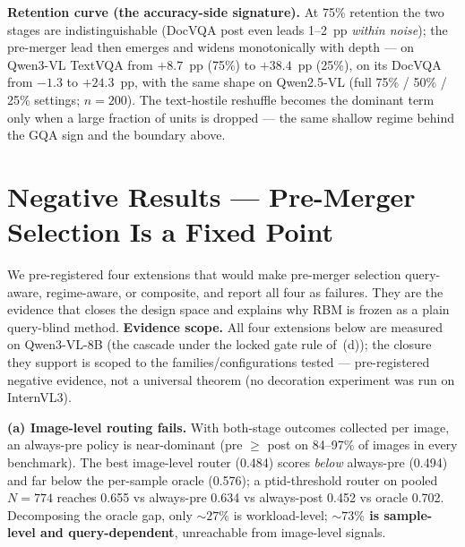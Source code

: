 \documentclass[sigconf,review,anonymous]{acmart}
\begin{document}
\textbf{Retention curve (the accuracy-side signature).} At 75\% retention the
two stages are indistinguishable (DocVQA post even leads 1--2~pp \emph{within
noise}); the pre-merger lead then emerges and widens monotonically with depth
--- on Qwen3-VL TextVQA from $+8.7$~pp (75\%) to $+38.4$~pp (25\%), on its
DocVQA from $-1.3$ to $+24.3$~pp, with the same shape on Qwen2.5-VL (full
75\% / 50\% / 25\% settings; $n = 200$). The
text-hostile reshuffle becomes the dominant term only when a large fraction of
units is dropped --- the same shallow regime behind the GQA sign and the
boundary above.

\section{Negative Results --- Pre-Merger Selection Is a Fixed Point}\label{sec:negative}

We pre-registered four extensions that would make pre-merger selection
query-aware, regime-aware, or composite, and report all four as failures. They
are the evidence that closes the design space and explains why RBM is frozen as
a plain query-blind method. \textbf{Evidence scope.} All four extensions below
are measured on Qwen3-VL-8B (the cascade under the locked gate rule of~(d)); the
closure they support is scoped to the families/configurations tested ---
pre-registered negative evidence, not a universal theorem (no decoration
experiment was run on InternVL3).

\textbf{(a) Image-level routing fails.} With both-stage outcomes collected per
image, an always-pre policy is near-dominant (pre $\geq$ post on 84--97\% of
images in every benchmark). The best image-level router (0.484) scores
\emph{below} always-pre (0.494) and far below the per-sample oracle (0.576); a
ptid-threshold router on pooled $N = 774$ reaches 0.655 vs always-pre 0.634 vs
always-post 0.452 vs oracle 0.702. Decomposing the oracle gap, only ${\sim}27\%$
is workload-level; \textbf{${\sim}73\%$ is sample-level and query-dependent},
unreachable from image-level signals.
\end{document}
